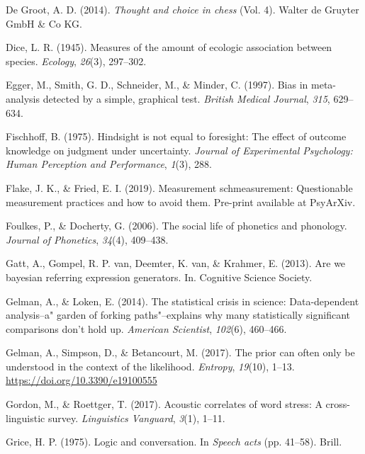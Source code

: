 \documentclass[
  english,
  man,floatsintext]{apa6}
\begin{document}
\leavevmode\hypertarget{ref-de2014thought}{}%
De Groot, A. D. (2014). \emph{Thought and choice in chess} (Vol. 4). Walter de Gruyter GmbH \& Co KG.

\leavevmode\hypertarget{ref-dice1945}{}%
Dice, L. R. (1945). Measures of the amount of ecologic association between species. \emph{Ecology}, \emph{26}(3), 297--302.

\leavevmode\hypertarget{ref-egger1997}{}%
Egger, M., Smith, G. D., Schneider, M., \& Minder, C. (1997). Bias in meta-analysis detected by a simple, graphical test. \emph{British Medical Journal}, \emph{315}, 629--634.

\leavevmode\hypertarget{ref-fischhoff1975hindsight}{}%
Fischhoff, B. (1975). Hindsight is not equal to foresight: The effect of outcome knowledge on judgment under uncertainty. \emph{Journal of Experimental Psychology: Human Perception and Performance}, \emph{1}(3), 288.

\leavevmode\hypertarget{ref-flake2019}{}%
Flake, J. K., \& Fried, E. I. (2019). Measurement schmeasurement: Questionable measurement practices and how to avoid them. Pre-print available at PsyArXiv.

\leavevmode\hypertarget{ref-foulkes2006}{}%
Foulkes, P., \& Docherty, G. (2006). The social life of phonetics and phonology. \emph{Journal of Phonetics}, \emph{34}(4), 409--438.

\leavevmode\hypertarget{ref-gatt2013we}{}%
Gatt, A., Gompel, R. P. van, Deemter, K. van, \& Krahmer, E. (2013). Are we bayesian referring expression generators. In. Cognitive Science Society.

\leavevmode\hypertarget{ref-gelman2014statistical}{}%
Gelman, A., \& Loken, E. (2014). The statistical crisis in science: Data-dependent analysis--a" garden of forking paths"--explains why many statistically significant comparisons don't hold up. \emph{American Scientist}, \emph{102}(6), 460--466.

\leavevmode\hypertarget{ref-Gelman_2017}{}%
Gelman, A., Simpson, D., \& Betancourt, M. (2017). The prior can often only be understood in the context of the likelihood. \emph{Entropy}, \emph{19}(10), 1--13. \url{https://doi.org/10.3390/e19100555}

\leavevmode\hypertarget{ref-gordon2017acoustic}{}%
Gordon, M., \& Roettger, T. (2017). Acoustic correlates of word stress: A cross-linguistic survey. \emph{Linguistics Vanguard}, \emph{3}(1), 1--11.

\leavevmode\hypertarget{ref-grice1975logic}{}%
Grice, H. P. (1975). Logic and conversation. In \emph{Speech acts} (pp. 41--58). Brill.
\end{document}
